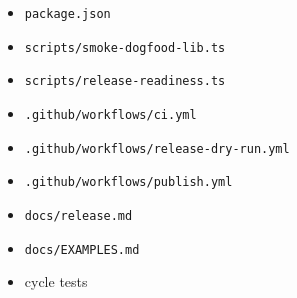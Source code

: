 \begin{itemize}
\tightlist
\item
  \texttt{p\allowbreak{}a\allowbreak{}c\allowbreak{}k\allowbreak{}a\allowbreak{}g\allowbreak{}e\allowbreak{}.\allowbreak{}j\allowbreak{}s\allowbreak{}o\allowbreak{}n}
\item
  \texttt{s\allowbreak{}c\allowbreak{}r\allowbreak{}i\allowbreak{}p\allowbreak{}t\allowbreak{}s\allowbreak{}/\allowbreak{}s\allowbreak{}m\allowbreak{}o\allowbreak{}k\allowbreak{}e\allowbreak{}-\allowbreak{}d\allowbreak{}o\allowbreak{}g\allowbreak{}f\allowbreak{}o\allowbreak{}o\allowbreak{}d\allowbreak{}-\allowbreak{}l\allowbreak{}i\allowbreak{}b\allowbreak{}.\allowbreak{}t\allowbreak{}s}
\item
  \texttt{s\allowbreak{}c\allowbreak{}r\allowbreak{}i\allowbreak{}p\allowbreak{}t\allowbreak{}s\allowbreak{}/\allowbreak{}r\allowbreak{}e\allowbreak{}l\allowbreak{}e\allowbreak{}a\allowbreak{}s\allowbreak{}e\allowbreak{}-\allowbreak{}r\allowbreak{}e\allowbreak{}a\allowbreak{}d\allowbreak{}i\allowbreak{}n\allowbreak{}e\allowbreak{}s\allowbreak{}s\allowbreak{}.\allowbreak{}t\allowbreak{}s}
\item
  \texttt{.\allowbreak{}g\allowbreak{}i\allowbreak{}t\allowbreak{}h\allowbreak{}u\allowbreak{}b\allowbreak{}/\allowbreak{}w\allowbreak{}o\allowbreak{}r\allowbreak{}k\allowbreak{}f\allowbreak{}l\allowbreak{}o\allowbreak{}w\allowbreak{}s\allowbreak{}/\allowbreak{}c\allowbreak{}i\allowbreak{}.\allowbreak{}y\allowbreak{}m\allowbreak{}l}
\item
  \texttt{.\allowbreak{}g\allowbreak{}i\allowbreak{}t\allowbreak{}h\allowbreak{}u\allowbreak{}b\allowbreak{}/\allowbreak{}w\allowbreak{}o\allowbreak{}r\allowbreak{}k\allowbreak{}f\allowbreak{}l\allowbreak{}o\allowbreak{}w\allowbreak{}s\allowbreak{}/\allowbreak{}r\allowbreak{}e\allowbreak{}l\allowbreak{}e\allowbreak{}a\allowbreak{}s\allowbreak{}e\allowbreak{}-\allowbreak{}d\allowbreak{}r\allowbreak{}y\allowbreak{}-\allowbreak{}r\allowbreak{}u\allowbreak{}n\allowbreak{}.\allowbreak{}y\allowbreak{}m\allowbreak{}l}
\item
  \texttt{.\allowbreak{}g\allowbreak{}i\allowbreak{}t\allowbreak{}h\allowbreak{}u\allowbreak{}b\allowbreak{}/\allowbreak{}w\allowbreak{}o\allowbreak{}r\allowbreak{}k\allowbreak{}f\allowbreak{}l\allowbreak{}o\allowbreak{}w\allowbreak{}s\allowbreak{}/\allowbreak{}p\allowbreak{}u\allowbreak{}b\allowbreak{}l\allowbreak{}i\allowbreak{}s\allowbreak{}h\allowbreak{}.\allowbreak{}y\allowbreak{}m\allowbreak{}l}
\item
  \texttt{d\allowbreak{}o\allowbreak{}c\allowbreak{}s\allowbreak{}/\allowbreak{}r\allowbreak{}e\allowbreak{}l\allowbreak{}e\allowbreak{}a\allowbreak{}s\allowbreak{}e\allowbreak{}.\allowbreak{}m\allowbreak{}d}
\item
  \texttt{d\allowbreak{}o\allowbreak{}c\allowbreak{}s\allowbreak{}/\allowbreak{}E\allowbreak{}X\allowbreak{}A\allowbreak{}M\allowbreak{}P\allowbreak{}L\allowbreak{}E\allowbreak{}S\allowbreak{}.\allowbreak{}m\allowbreak{}d}
\item
  cycle tests
\end{itemize}

